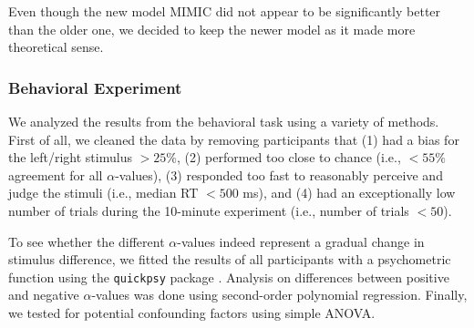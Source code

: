 \documentclass[../main.tex]{subfiles}
\begin{document}
	Even though the new model MIMIC did not appear to be significantly better than the older one, we decided to keep the newer model as it made more theoretical sense.
	
	
	
	\subsubsection{Behavioral Experiment}
	We analyzed the results from the behavioral task using a variety of methods. First of all, we cleaned the data by removing participants that (1) had a bias for the left/right stimulus $>25\%$, (2) performed too close to chance (i.e., $<55\%$ agreement for all $\alpha$-values), (3) responded too fast to reasonably perceive and judge the stimuli (i.e., median RT $<500$ ms), and (4) had an exceptionally low number of trials during the 10-minute experiment (i.e., number of trials $<50$).
	
	To see whether the different $\alpha$-values indeed represent a gradual change in stimulus difference, we fitted the results of all participants with a psychometric function using the \texttt{quickpsy} package \parencite{linares2016quickpsy}. Analysis on differences between positive and negative $\alpha$-values was done using second-order polynomial regression. Finally, we tested for potential confounding factors using simple ANOVA.
	
\end{document}
